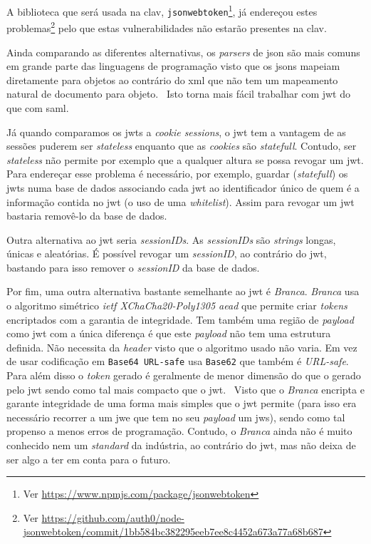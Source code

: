 A biblioteca que será usada na \acrshort{clav}, 
\texttt{jsonwebtoken}\footnote{Ver \url{https://www.npmjs.com/package/jsonwebtoken}}, já endereçou estes 
problemas\footnote{Ver \url{https://github.com/auth0/node-jsonwebtoken/commit/1bb584bc382295eeb7ee8c4452a673a77a68b687}} 
pelo que estas vulnerabilidades não estarão presentes na \acrshort{clav}.

Ainda comparando as diferentes alternativas, os \textit{parsers} de \acrshort{json} são mais comuns em grande 
parte das linguagens de programação visto que os \acrshort{json}s mapeiam diretamente para objetos ao contrário 
do \acrshort{xml} que não tem um mapeamento natural de documento para objeto.~\cite{jwtio} 
Isto torna mais fácil trabalhar com \acrshort{jwt} do que com \acrshort{saml}.

Já quando comparamos os \acrshort{jwt}s a \textit{cookie sessions}, o \acrshort{jwt} tem a vantagem de as sessões 
puderem ser \textit{stateless} enquanto que as \textit{cookies} são \textit{statefull}. Contudo, 
ser \textit{stateless} não permite por exemplo que a qualquer altura se possa revogar um \acrshort{jwt}. 
Para endereçar esse problema é necessário, por exemplo, guardar (\textit{statefull}) os \acrshort{jwt}s numa base 
de dados associando cada \acrshort{jwt} ao identificador único de quem é a informação contida no \acrshort{jwt} 
(o uso de uma \textit{whitelist}). Assim para revogar um \acrshort{jwt} bastaria removê-lo da base de dados.

Outra alternativa ao \acrshort{jwt} seria \textit{sessionIDs}. As \textit{sessionIDs} são \textit{strings} longas, 
únicas e aleatórias. É possível revogar um \textit{sessionID}, ao contrário do \acrshort{jwt}, bastando para isso 
remover o \textit{sessionID} da base de dados.

Por fim, uma outra alternativa bastante semelhante ao \acrshort{jwt} é \textit{Branca}. 
\textit{Branca} usa o algoritmo simétrico \textit{\acrshort{ietf} XChaCha20-Poly1305 \acrshort{aead}} que permite 
criar \textit{tokens} encriptados com a garantia de integridade. Tem também uma região de \textit{payload} como 
\acrshort{jwt} com a única diferença é que este \textit{payload} não tem uma estrutura definida. Não necessita da 
\textit{header} visto que o algoritmo usado não varia. Em vez de usar codificação em \texttt{Base64 URL-safe} 
usa \texttt{Base62} que também é \textit{URL-safe}. Para além disso o \textit{token} gerado é geralmente de menor 
dimensão do que o gerado pelo \acrshort{jwt} sendo como tal mais compacto que o \acrshort{jwt}.~\cite{branca} 
Visto que o \textit{Branca} encripta e garante integridade de uma forma mais simples que o \acrshort{jwt} 
permite (para isso era necessário recorrer a um \acrshort{jwe} que tem no seu \textit{payload} um \acrshort{jws}), 
sendo como tal propenso a menos erros de programação. 
Contudo, o \textit{Branca} ainda não é muito conhecido nem um \textit{standard} da indústria, ao contrário do 
\acrshort{jwt}, mas não deixa de ser algo a ter em conta para o futuro. 

